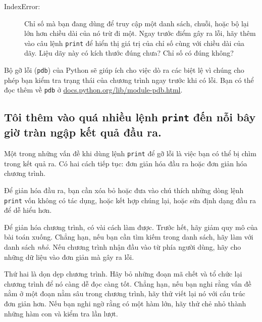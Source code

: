 \documentclass[11pt]{book}
\begin{document}
\begin{description}

\item[IndexError:] Chỉ số mà bạn đang dùng để 
truy cập một danh sách, chuỗi, hoặc bộ lại lớn hơn chiều dài của nó
trừ đi một. Ngay trước điểm gây ra lỗi, hãy thêm vào 
câu lệnh {\tt print} để hiển thị giá trị của chỉ số
cùng với chiều dài của dãy.
Liệu dãy này có kích thước đúng chưa? Chỉ số có đúng không?


\end{description}


Bộ gỡ lỗi ({\tt pdb}) của Python sẽ giúp ích cho việc dò ra
các biệt lệ vì chúng cho phép bạn kiểm tra trạng thái của
chương trình ngay trước khi có lỗi. Bạn có thể đọc thêm về
{\tt pdb} ở  \url{docs.python.org/lib/module-pdb.html}.


\subsection{Tôi thêm vào quá nhiều lệnh {\tt print} đến nỗi bây giờ
tràn ngập kết quả đầu ra.}


Một trong những vấn đề khi dùng lệnh {\tt print} để gỡ lỗi là
việc bạn có thể bị chìm trong kết quả ra. Có hai cách tiếp tục:
đơn giản hóa đầu ra hoặc đơn giản hóa chương trình.

Để giản hóa đầu ra, bạn cần xóa bỏ hoặc đưa vào chú thích những dòng lệnh {\tt print}
vốn không có tác dụng, hoặc kết hợp chúng lại, hoặc sửa định dạng
đầu ra để dễ hiểu hơn.

Để giản hóa chương trình, có vài cách làm được. Trước hết, 
hãy giảm quy mô của bài toán xuống. Chẳng hạn, nếu bạn cần tìm kiếm
trong danh sách, hãy làm với danh sách {\em nhỏ}. Nếu chương trình
nhận đầu vào từ phía người dùng, hãy cho những dữ liệu vào đơn giản
mà gây ra lỗi.


Thứ hai là dọn dẹp chương trình. Hãy bỏ những đoạn mã chết và tổ chức lại
chương trình để nó càng dễ đọc càng tốt. Chẳng hạn, nếu bạn nghi rằng
vấn đề nằm ở một đoạn nằm sâu trong chương trình, hãy thử viết lại nó 
với cấu trúc đơn giản hơn. Nếu bạn nghi ngờ rằng có một
hàm lớn, hãy thử chẻ nhỏ thành những hàm con và kiểm tra lần lượt.
\end{document}
